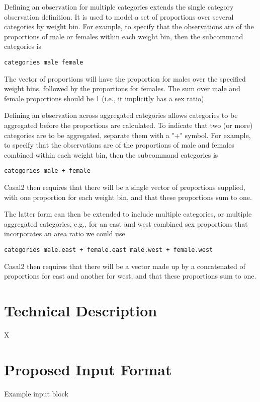 \documentclass[a4paper,11pt,twoside,pdftex,draft]{article}
\begin{document}
Defining an observation for multiple categories extends the single category observation definition. It is used to model a set of proportions over several categories by weight bin. For example, to specify that the observations are of the proportions of male or females within each weight bin, then the subcommand categories is

\texttt{categories male female}

The vector of proportions will have the proportion for males over the specified weight bins, followed by the proportions for females. The sum over male and female proportions should be 1 (i.e., it implicitly has a sex ratio).

Defining an observation across aggregated categories allows categories to be aggregated before the proportions are calculated.  To indicate that two (or more) categories are to be aggregated, separate them with a "+" symbol. For example, to specify that the observations are of the proportions of male and females combined within each weight bin, then the subcommand categories is

\texttt{categories male + female}

Casal2 then requires that there will be a single vector of proportions supplied, with one proportion for each weight bin, and that these proportions sum to one.

The latter form can then be extended to include multiple categories, or multiple aggregated categories, e.g., for an east and west combined sex proportions that incorporates an area ratio we could use

\texttt{categories male.east + female.east   male.west + female.west}

Casal2 then requires that there will be a vector made up by a concatenated of proportions for east and another for west, and that these proportions sum to one.

\section{Technical Description}

X

\section{Proposed Input Format}

Example input block
\end{document}
